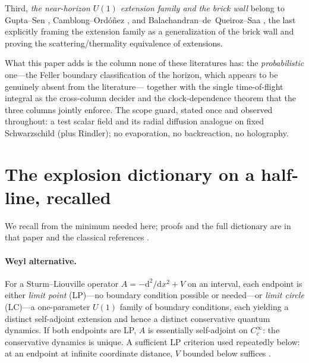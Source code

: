 \documentclass[11pt]{article}
\theoremstyle{definition}
\theoremstyle{remark}
\newcommand{\dd}{\mathrm{d}}
\begin{document}
Third, \emph{the near-horizon $U(1)$ extension family and the brick
wall} belong to Gupta--Sen \cite{GuptaSen2002}, Camblong--Ord\'o\~nez
\cite{CamblongOrdonez2005,CamblongOrdonez2007}, and
Balachandran--de~Queiroz--Saa \cite{Balachandran2018}, the last
explicitly framing the extension family as a generalization of the
brick wall and proving the scattering/thermality equivalence of
extensions.

What this paper adds is the column none of these literatures has: the
\emph{probabilistic} one---the Feller boundary classification of the
horizon, which appears to be genuinely absent from the literature---
together with the single time-of-flight integral as the cross-column
decider and the clock-dependence theorem that the three columns jointly
enforce. The scope guard, stated once and observed throughout: a test
scalar field and its radial diffusion analogue on fixed Schwarzschild
(plus Rindler); no evaporation, no backreaction, no holography.

\section{The explosion dictionary on a half-line, recalled}
\label{sec:dictionary}

We recall from \cite{indivisible} the minimum needed here; proofs and
the full dictionary are in that paper and the classical references
\cite{Feller1952,ItoMcKean,KarlinTaylor,ReedSimon2}.

\paragraph{Weyl alternative.} For a Sturm--Liouville operator
$A=-\dd^{2}/\dd x^{2}+V$ on an interval, each endpoint is either
\emph{limit point} (LP)---no boundary condition possible or needed---or
\emph{limit circle} (LC)---a one-parameter $U(1)$ family of boundary
conditions, each yielding a distinct self-adjoint extension and hence
a distinct conservative quantum dynamics. If both endpoints are LP,
$A$ is essentially self-adjoint on $C_{c}^{\infty}$: the conservative
dynamics is unique. A sufficient LP criterion used repeatedly below:
at an endpoint at infinite coordinate distance, $V$ bounded below
suffices \cite[Thm.~X.8 and Appendix to X.1]{ReedSimon2}.
\end{document}
